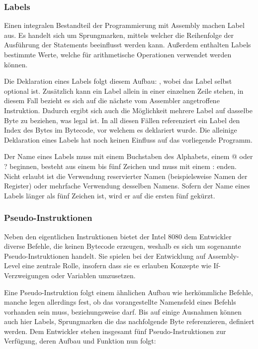 \subsubsection{Labels}

Einen integralen Bestandteil der Programmierung mit Assembly machen \glqq Label\grqq{} aus. Es handelt sich um Sprungmarken, mittels welcher die Reihenfolge der Ausführung der Statements beeinflusst werden kann. Außerdem enthalten Labels bestimmte Werte, welche für arithmetische Operationen verwendet werden können.

Die Deklaration eines Labels folgt diesem Aufbau: , wobei das Label selbst optional ist. Zusätzlich kann ein Label allein in einer einzelnen Zeile stehen, in diesem Fall bezieht es sich auf die nächste vom Assembler angetroffene Instruktion. Dadurch ergibt sich auch die Möglichkeit mehrere Label auf dasselbe Byte zu beziehen, was legal ist. In all diesen Fällen referenziert ein Label den Index des Bytes im Bytecode, vor welchem es deklariert wurde. Die alleinige Deklaration eines Labels hat noch keinen Einfluss auf das vorliegende Programm.

Der Name eines Labels muss mit einem Buchstaben des Alphabets, einem \glqq @\grqq{} oder \glqq ?\grqq{} beginnen, besteht aus einem bis fünf Zeichen und muss mit einem  \glqq :\grqq{} enden. Nicht erlaubt ist die Verwendung reservierter Namen (beispielsweise Namen der Register) oder mehrfache Verwendung desselben Namens. Sofern der Name eines Labels länger als fünf Zeichen ist, wird er auf die ersten fünf gekürzt.

\subsubsection{Pseudo-Instruktionen}\label{chap:pseudo-instructions}

Neben den eigentlichen Instruktionen bietet der Intel 8080 dem Entwickler diverse Befehle, die keinen Bytecode erzeugen, weshalb es sich um sogenannte \glqq Pseudo-Instruktionen\grqq{} handelt. Sie spielen bei der Entwicklung auf Assembly-Level eine zentrale Rolle, insofern dass sie es erlauben Konzepte wie If-Verzweigungen oder Variablen umzusetzen.

Eine Pseudo-Instruktion folgt einem ähnlichen Aufbau wie herkömmliche Befehle, manche legen allerdings fest, ob das vorangestellte Namensfeld eines Befehls vorhanden sein muss, beziehungsweise darf. Bis auf einige Ausnahmen können auch hier Labels, Sprungmarken die das nachfolgende Byte referenzieren, definiert werden. Dem Entwickler stehen insgesamt fünf Pseudo-Instruktionen zur Verfügung, deren Aufbau und Funktion nun folgt:
\linebreak

